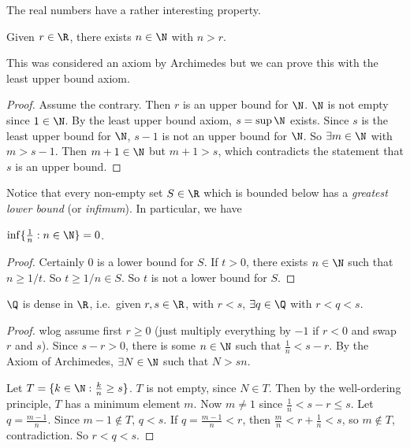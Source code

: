 \documentclass[a4paper]{article}
\begin{document}
The real numbers have a rather interesting property.
\begin{thm}
  Given $r\in \R$, there exists $n\in \N$ with $n > r$.
\end{thm}

This was considered an axiom by Archimedes but we can prove this with the least upper bound axiom.

\begin{proof}
  Assume the contrary. Then $r$ is an upper bound for $\N$. $\N$ is not empty since $1\in \N$. By the least upper bound axiom, $s = \sup \N$ exists. Since $s$ is the least upper bound for $\N$, $s - 1$ is not an upper bound for $\N$. So $\exists m\in \N$ with $m > s - 1$. Then $m + 1\in \N$ but $m + 1 > s$, which contradicts the statement that $s$ is an upper bound.
\end{proof}

Notice that every non-empty set $S\in \R$ which is bounded below has a \emph{greatest lower bound} (or \emph{infimum}). In particular, we have

\begin{prop}
  $\inf\{\frac{1}{n}: n\in \N\} = 0$.
\end{prop}

\begin{proof}
  Certainly $0$ is a lower bound for $S$. If $t > 0$, there exists $n \in \N$ such that $n \geq 1/t$. So $t \geq 1/n\in S$. So $t$ is not a lower bound for $S$.
\end{proof}

\begin{thm}
  $\Q$ is dense in $\R$, i.e.\ given $r, s\in \R$, with $r < s$, $\exists q\in \Q$ with $r < q < s$.
\end{thm}

\begin{proof}
  wlog assume first $r \geq 0$ (just multiply everything by $-1$ if $r < 0$ and swap $r$ and $s$). Since $s - r > 0$, there is some $n \in \N$ such that $\frac{1}{n} < s - r$. By the Axiom of Archimedes, $\exists N\in \N$ such that $N > sn$.

  Let $T = \{k\in \N: \frac{k}{n}\geq s\}$. $T$ is not empty, since $N\in T$. Then by the well-ordering principle, $T$ has a minimum element $m$. Now $m\not= 1$ since $\frac{1}{n} < s - r \leq s$. Let $q = \frac{m - 1}{n}$. Since $m - 1\not\in T$, $q < s$. If $q =\frac{m - 1}{n}< r$, then $\frac{m}{n} < r + \frac{1}{n} < s$, so $m\not\in T$, contradiction. So $r < q < s$.
\end{proof}
\end{document}
